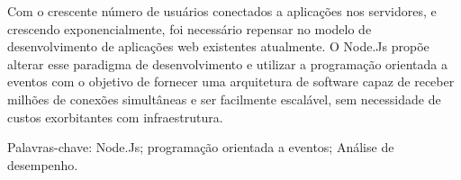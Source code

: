 \begin{resumo}
\vspace{-1cm}

\onehalfspacing

\noindent 
  Com o crescente número de usuários conectados a aplicações nos servidores, e crescendo exponencialmente, 
  foi necessário repensar no modelo de desenvolvimento de aplicações web existentes atualmente. 
  O Node.Js propõe alterar esse paradigma de desenvolvimento e utilizar a programação orientada a eventos 
  com o objetivo de fornecer uma arquitetura de software capaz de receber milhões de conexões simultâneas 
  e ser facilmente escalável, sem necessidade de custos exorbitantes com infraestrutura.

\vspace*{.75cm}

\noindent Palavras-chave: Node.Js; programação orientada a eventos; Análise de desempenho.\\

\end{resumo}